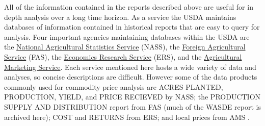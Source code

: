 \documentclass[
  letterpaper,
  DIV=11,
  numbers=noendperiod]{scrreprt}
\begin{document}
All of the information contained in the reports described above are
useful for in depth analysis over a long time horizon. As a service the
USDA maintains databases of information contained in historical reports
that are easy to query for analysis. Four important agencies maintaining
databases within the USDA are the
\href{http://www.nass.usda.gov/}{National Agricultural Statistics
Service} (NASS), the
\href{http://apps.fas.usda.gov/psdonline/psdHome.aspx}{Foreign
Agricultural Service} (FAS), the
\href{http://www.ers.usda.gov/data-products.aspx}{Economics Research
Service} (ERS), and the
\href{http://www.ams.usda.gov/market-news/livestock-poultry-grain\#Grain}{Agricultural
Marketing Service}. Each service mentioned here hosts a wide variety of
data and analyses, so concise descriptions are difficult. However some
of the data products commonly used for commodity price analysis are
ACRES PLANTED, PRODUCTION, YIELD, and PRICE RECIEVED by NASS; the
PRODUCTION SUPPLY AND DISTRIBUTION report from FAS (much of the WASDE
report is archived here); COST and RETURNS from ERS; and local prices
from AMS .
\end{document}
